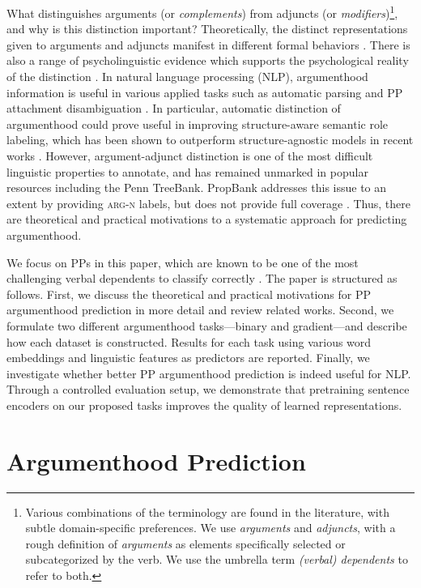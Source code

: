 \documentclass[letterpaper]{article} %
\begin{document}
\noindent What distinguishes arguments (or \textit{complements}) from adjuncts (or \textit{modifiers})\footnote{Various combinations of the terminology are found in the literature, with subtle domain-specific preferences. We use \textit{arguments} and \textit{adjuncts}, with a rough definition of \textit{arguments} as elements specifically selected or subcategorized by the verb. We use the umbrella term \textit{(verbal) dependents} to refer to both.}, and why is this distinction important? Theoretically, the distinct representations given to arguments and adjuncts manifest in different formal behaviors \cite{chomsky1993lectures,steedman2000syntactic}. There is also a range of psycholinguistic evidence which supports the psychological reality of the distinction \cite{tutunjian2008we}. In natural language processing (NLP), argumenthood information is useful in various applied tasks such as automatic parsing \cite{briscoe1998can} and PP attachment disambiguation \cite{merlo2006notion}. In particular, automatic distinction of argumenthood could prove useful in improving structure-aware semantic role labeling, which has been shown to outperform structure-agnostic models in recent works \cite{marcheggiani2017encoding}. However, argument-adjunct distinction is one of the most difficult linguistic properties to annotate, and has remained unmarked in popular resources including the Penn TreeBank. PropBank \cite{palmer2005proposition} addresses this issue to an extent by providing \textsc{arg-n} labels, but does not provide full coverage \cite{hockenmaier2002acquiring}. Thus, there are theoretical and practical motivations to a systematic approach for predicting argumenthood.

We focus on PPs in this paper, which are known to be one of the most challenging verbal dependents to classify correctly \cite{abend2010fully}. The paper is structured as follows. First, we discuss the theoretical and practical motivations for PP argumenthood prediction in more detail and review related works. Second, we formulate two different argumenthood tasks---binary and gradient---and describe how each dataset is constructed. Results for each task using various word embeddings and linguistic features as predictors are reported. Finally, we investigate whether better PP argumenthood prediction is indeed useful for NLP. Through a controlled evaluation setup, we demonstrate that pretraining sentence encoders on our proposed tasks improves the quality of learned representations.

\section{Argumenthood Prediction}
\label{theoretical}
\end{document}
